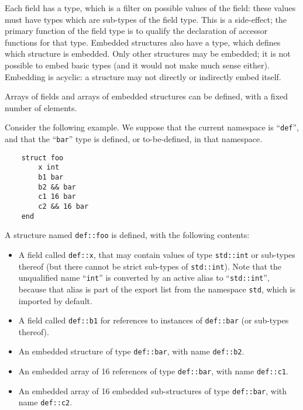 Each field has a type, which is a filter on possible values of the
field: these values must have types which are sub-types of the field
type. This is a side-effect; the primary function of the field type is
to qualify the declaration of accessor functions for that type. Embedded
structures also have a type, which defines which structure is embedded.
Only other structures may be embedded; it is not possible to embed basic
types (and it would not make much sense either). Embedding is acyclic: a
structure may not directly or indirectly embed itself.

Arrays of fields and arrays of embedded structures can be defined, with
a fixed number of elements.

Consider the following example. We suppose that the current namespace
is ``\verb|def|'', and that the ``\verb|bar|'' type is defined, or
to-be-defined, in that namespace.
\begin{verbatim}
    struct foo
        x int
        b1 bar
        b2 && bar
        c1 16 bar
        c2 && 16 bar
    end
\end{verbatim}

A structure named \verb|def::foo| is defined, with the following contents:
\begin{itemize}

    \item A field called \verb|def::x|, that may contain values of type
    \verb|std::int| or sub-types thereof (but there cannot be strict
    sub-types of \verb|std::int|). Note that the unqualified name
    ``\verb|int|'' is converted by an active alias to ``\verb|std::int|'',
    because that alias is part of the export list from the namespace
    \verb|std|, which is imported by default.

    \item A field called \verb|def::b1| for references to instances of
    \verb|def::bar| (or sub-types thereof).

    \item An embedded structure of type \verb|def::bar|, with name
    \verb|def::b2|.

    \item An embedded array of 16 references of type \verb|def::bar|,
    with name \verb|def::c1|.

    \item An embedded array of 16 embedded sub-structures of type 
    \verb|def::bar|, with name \verb|def::c2|.

\end{itemize}

